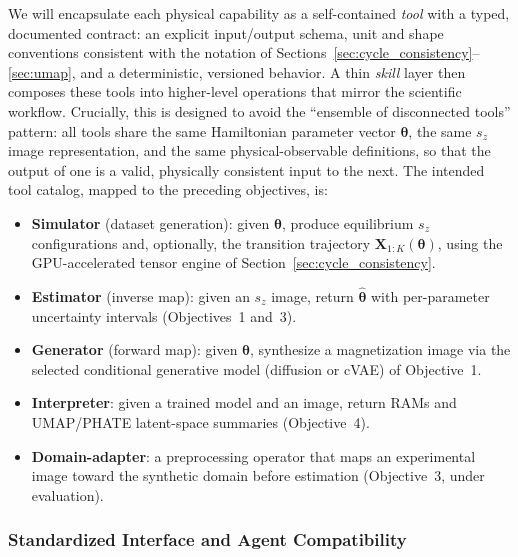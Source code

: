 \documentclass[letterpaper, 12, one column]{article}
\begin{document}
We will encapsulate each physical capability as a self-contained \emph{tool} with a typed, documented contract: an explicit input/output schema, unit and shape conventions consistent with the notation of Sections~\ref{sec:cycle_consistency}--\ref{sec:umap}, and a deterministic, versioned behavior. A thin \emph{skill} layer then composes these tools into higher-level operations that mirror the scientific workflow. Crucially, this is designed to avoid the ``ensemble of disconnected tools'' pattern: all tools share the same Hamiltonian parameter vector $\boldsymbol{\theta}$, the same $s_z$ image representation, and the same physical-observable definitions, so that the output of one is a valid, physically consistent input to the next. The intended tool catalog, mapped to the preceding objectives, is:
\begin{itemize}
    \item[--] \textbf{Simulator} (dataset generation): given $\boldsymbol{\theta}$, produce equilibrium $s_z$ configurations and, optionally, the transition trajectory $\mathbf{X}_{1:K}(\boldsymbol{\theta})$, using the GPU-accelerated tensor engine of Section~\ref{sec:cycle_consistency}.
    \item[--] \textbf{Estimator} (inverse map): given an $s_z$ image, return $\hat{\boldsymbol{\theta}}$ with per-parameter uncertainty intervals (Objectives~1 and~3).
    \item[--] \textbf{Generator} (forward map): given $\boldsymbol{\theta}$, synthesize a magnetization image via the selected conditional generative model (diffusion or cVAE) of Objective~1.
    \item[--] \textbf{Interpreter}: given a trained model and an image, return RAMs and UMAP/PHATE latent-space summaries (Objective~4).
    \item[--] \textbf{Domain-adapter}: a preprocessing operator that maps an experimental image toward the synthetic domain before estimation (Objective~3, under evaluation).
\end{itemize}

\subsubsection{Standardized Interface and Agent Compatibility}
\end{document}

